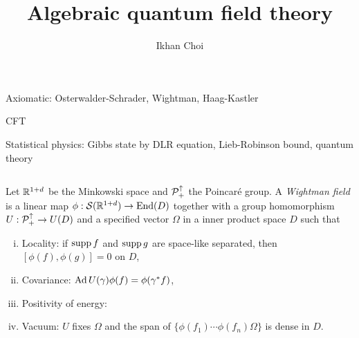 \documentclass{../../large}
\begin{document}
\title{Algebraic quantum field theory}
\author{Ikhan Choi}
\maketitle
\tableofcontents



\chapter{}

Axiomatic: Osterwalder-Schrader, Wightman, Haag-Kastler

CFT

Statistical physics: Gibbs state by DLR equation, Lieb-Robinson bound, quantum theory


\section{}

\begin{prb}
Let $\mathbb{R}^{1+d}$ be the Minkowski space and $\mathcal{P}_+^\uparrow$ the Poincar\'e group.
A \emph{Wightman field} is a linear map $\phi:\mathcal{S}(\mathbb{R}^{1+d})\to\operatorname{End}(D)$ together with a group homomorphism $U:\mathcal{P}_+^\uparrow\to U(D)$ and a specified vector $\Omega$ in a inner product space $D$ such that
\begin{enumerate}[(i)]
\item Locality: if $\operatorname{supp} f$ and $\operatorname{supp} g$ are space-like separated, then $[\phi(f),\phi(g)]=0$ on $D$,
\item Covariance: $\operatorname{Ad} U(\gamma)\phi(f)=\phi(\gamma^*f)$,
\item Positivity of energy: 
\item Vacuum: $U$ fixes $\Omega$ and the span of $\{\phi(f_1)\cdots\phi(f_n)\Omega\}$ is dense in $D$.
\end{enumerate}
\end{prb}
\end{document}
